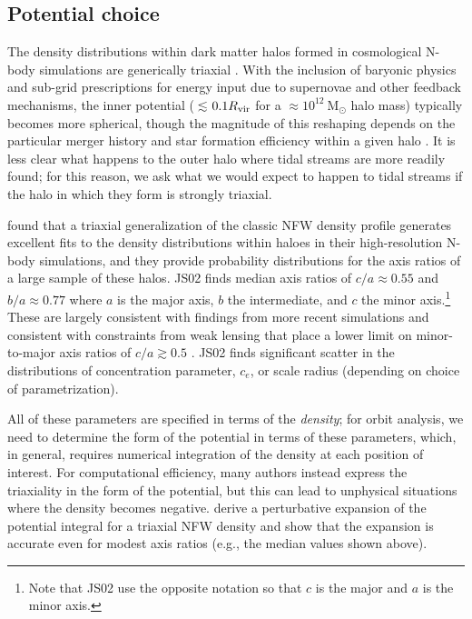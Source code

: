 \documentclass[letterpaper,12pt,preprint]{aastex}
\newcommand{\msun}{\ensuremath{\mathrm{M}_\odot}}
\begin{document}
\subsection{Potential choice}\label{sec:potential}

The density distributions within dark matter halos formed in cosmological N-body simulations are generically triaxial \citep[e.g.,][]{jing02, bett07, zemp09, veraciro11}. With the inclusion of baryonic physics and sub-grid prescriptions for energy input due to supernovae and other feedback mechanisms, the inner potential ($\lesssim$$0.1R_{\rm vir}$ for a $\approx$$10^{12}~\msun$ halo mass) typically becomes more spherical, though the magnitude of this reshaping depends on the particular merger history and star formation efficiency within a given halo \citep[e.g.,][]{dubinski??, recent NiHao stuff}. It is less clear what happens to the outer halo where tidal streams are more readily found; for this reason, we ask what we would expect to happen to tidal streams if the halo in which they form is strongly triaxial.

 \citet[][hereafter JS02]{jing02} found that a triaxial generalization of the classic NFW density profile \citep{navarro96} generates excellent fits to the density distributions within haloes in their high-resolution N-body simulations, and they provide probability distributions for the axis ratios of a large sample of these halos. JS02 finds median axis ratios of $c/a \approx 0.55$ and $b/a \approx 0.77$ where $a$ is the major axis, $b$ the intermediate, and $c$ the minor axis.\footnote{Note that JS02 use the opposite notation so that $c$ is the major and $a$ is the minor axis.} These are largely consistent with findings from more recent simulations \citep[e.g.,][]{??, NiHao} and consistent with constraints from weak lensing that place a lower limit on minor-to-major axis ratios of $c/a\gtrsim0.5$ \citep{vanuitert12}. JS02 finds significant scatter in the distributions of concentration parameter, $c_e$, or scale radius (depending on choice of parametrization). 

All of these parameters are specified in terms of the \emph{density}; for orbit analysis, we need to determine the form of the potential in terms of these parameters, which, in general, requires numerical integration of the density at each position of interest. For computational efficiency, many authors instead express the triaxiality in the form of the potential, but this can lead to unphysical situations where the density becomes negative. \citet{leesuto03} derive a perturbative expansion of the potential integral for a triaxial NFW density and show that the expansion is accurate even for modest axis ratios (e.g., the median values shown above). 
\end{document}
